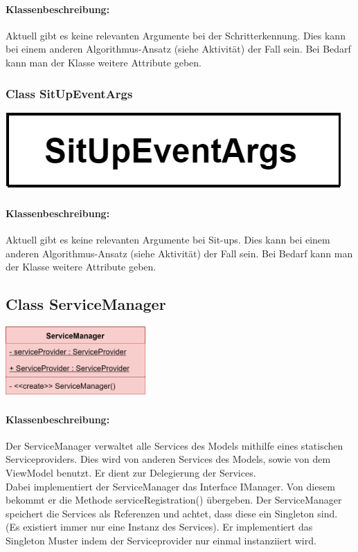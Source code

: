 \documentclass[a4paper,12pt]{article}
\begin{document}
	\paragraph{Klassenbeschreibung:}
	Aktuell gibt es keine relevanten Argumente bei der Schritterkennung. Dies kann bei einem anderen Algorithmus-Ansatz (siehe Aktivität) der Fall sein. Bei Bedarf kann man der Klasse weitere Attribute geben.\\
	\newline
	\begin{minipage}[b]{0.6\textwidth}
		\subsubsection{Class SitUpEventArgs}
		\end{minipage}
		\begin{minipage}[c]{0.5\textwidth}
			\includegraphics{bilder/EMKlassen/SitUpEventArgsClass.png}
		\end{minipage}
	\paragraph{Klassenbeschreibung:}
	Aktuell gibt es keine relevanten Argumente bei Sit-ups. Dies kann bei einem anderen Algorithmus-Ansatz (siehe Aktivität) der Fall sein. Bei Bedarf kann man der Klasse weitere Attribute geben.\\
	\newline
	


\subsection{Class ServiceManager}
	\includegraphics[width=0.4\textwidth]{bilder/EMKlassen/ServiceManagerClass.png}
	\paragraph{Klassenbeschreibung:}
	Der ServiceManager verwaltet alle Services des Models mithilfe eines statischen Serviceproviders. Dies wird von anderen Services des Models, sowie von dem ViewModel benutzt. Er dient zur Delegierung der Services.\\ 
	Dabei implementiert der ServiceManager das Interface IManager.
	Von diesem bekommt er die Methode serviceRegistration() übergeben.
	Der ServiceManager speichert die Services als Referenzen und achtet, dass diese ein Singleton sind. (Es existiert immer nur eine Instanz des Services).
	Er implementiert das Singleton Muster indem der Serviceprovider nur einmal instanziiert wird.
	
\end{document}
